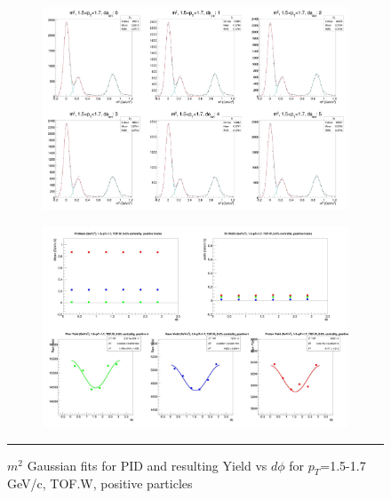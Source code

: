 \begin{figure}[H]
  \centering
    \begin{subfigure}[p]{1\textwidth}
    \includegraphics[width=1\textwidth]{lowptfits/yieldvsdphi_tof1_cent0_ch1_pT-15-17.jpg}
    \end{subfigure}
    \begin{subfigure}[p]{1\textwidth}
    \includegraphics[width=1\textwidth]{lowptfits/fitParams_tof1_cent0_ch1_pT-15-17.jpg}
    \end{subfigure}
    \rule{35em}{0.5pt}
  \caption[PID fits and Yield vs $d\phi$ for $p_T$=1.5-1.7 GeV/c, TOF.W, positive particles ]{$m^2$ Gaussian fits for PID and resulting Yield vs $d\phi$ for $p_T$=1.5-1.7 GeV/c, TOF.W, positive particles}
  \label{fig:fits15-17pos}
\end{figure}

